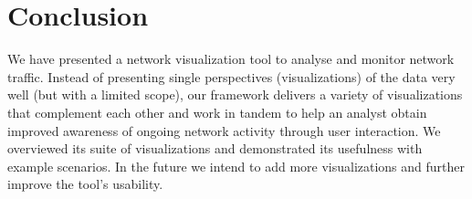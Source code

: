 \section{Conclusion} \label{sec:conc}
%
We have presented a network visualization tool to analyse and monitor network traffic. Instead of
presenting single perspectives (visualizations) of the data very well (but with a limited scope),
our framework delivers a variety of visualizations that complement each other and work in tandem to
help an analyst obtain improved awareness of ongoing network activity through user interaction. We
overviewed its suite of visualizations and demonstrated its usefulness with example scenarios. In
the future we intend to add more visualizations and further improve the tool's usability.





